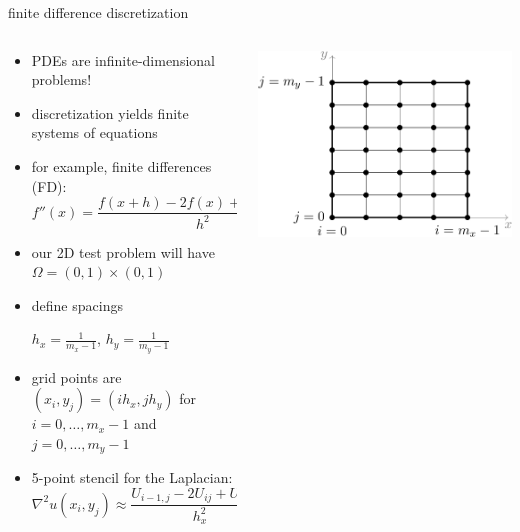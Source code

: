 \documentclass[10pt,
               svgnames,
               hyperref={colorlinks,citecolor=DeepPink4,linkcolor=FireBrick,urlcolor=Maroon},
               usepdftitle=false]{beamer}
\newcommand{\grad}{\nabla}
\begin{document}
\begin{frame}{finite difference discretization}
\begin{columns}
\begin{column}{0.7\textwidth}
\begin{itemize}
\item PDEs are infinite-dimensional problems!
\item discretization yields finite systems of equations
\item for example, finite differences (FD):
    $$f''(x) = \frac{f(x+h) - 2 f(x) + f(x-h)}{h^2} + O(h^2)$$
\item our 2D test problem will have $\Omega = (0,1) \times (0,1)$
\item define spacings \strut $h_x=\frac{1}{m_x-1}$, $h_y=\frac{1}{m_y-1}$
\item grid points are $(x_i,y_j) = (ih_x,jh_y)$ for $i=0,\dots,m_x-1$ and $j=0,\dots,m_y-1$
\item 5-point stencil for the Laplacian:
{\small
$$\grad^2 u(x_i,y_j) \approx \frac{U_{i-1,j} - 2 U_{ij} + U_{i+1,j}}{h_x^2} + \frac{U_{i,j-1} - 2 U_{ij} + U_{i,j+1}}{h_y^2}$$
}
\end{itemize}
\end{column}
\begin{column}{0.3\textwidth}
\hfill \includegraphics[width=\textwidth]{images/gridindexing.png}


\end{column}
\end{columns}
\end{frame}
\end{document}
